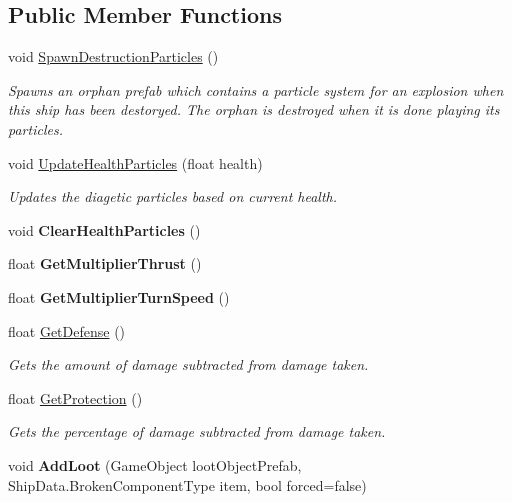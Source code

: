 \subsection*{Public Member Functions}
\begin{DoxyCompactItemize}
\item 
void \hyperlink{class_skyrates_1_1_ship_1_1_ship_hull_a151ef86db5f7fb51fafc874fd2174c6c}{Spawn\-Destruction\-Particles} ()
\begin{DoxyCompactList}\small\item\em Spawns an orphan prefab which contains a particle system for an explosion when this ship has been destoryed. The orphan is destroyed when it is done playing its particles. \end{DoxyCompactList}\item 
void \hyperlink{class_skyrates_1_1_ship_1_1_ship_hull_addcf983df8b3aa8556d77730be45ecc8}{Update\-Health\-Particles} (float health)
\begin{DoxyCompactList}\small\item\em Updates the diagetic particles based on current health. \end{DoxyCompactList}\item 
\hypertarget{class_skyrates_1_1_ship_1_1_ship_hull_aec02117909883a4e32676b3431f92072}{void {\bfseries Clear\-Health\-Particles} ()}\label{class_skyrates_1_1_ship_1_1_ship_hull_aec02117909883a4e32676b3431f92072}

\item 
\hypertarget{class_skyrates_1_1_ship_1_1_ship_hull_a31ea2269f79ffc533d3c0ce80ac59a24}{float {\bfseries Get\-Multiplier\-Thrust} ()}\label{class_skyrates_1_1_ship_1_1_ship_hull_a31ea2269f79ffc533d3c0ce80ac59a24}

\item 
\hypertarget{class_skyrates_1_1_ship_1_1_ship_hull_a97cbc4f31c6664328ce5ac804e4b5510}{float {\bfseries Get\-Multiplier\-Turn\-Speed} ()}\label{class_skyrates_1_1_ship_1_1_ship_hull_a97cbc4f31c6664328ce5ac804e4b5510}

\item 
float \hyperlink{class_skyrates_1_1_ship_1_1_ship_hull_a22cc110b5c5d2ee55b9da0c34da68468}{Get\-Defense} ()
\begin{DoxyCompactList}\small\item\em Gets the amount of damage subtracted from damage taken. \end{DoxyCompactList}\item 
float \hyperlink{class_skyrates_1_1_ship_1_1_ship_hull_adb5a6383a4f88675441a24f4c7c33f8b}{Get\-Protection} ()
\begin{DoxyCompactList}\small\item\em Gets the percentage of damage subtracted from damage taken. \end{DoxyCompactList}\item 
\hypertarget{class_skyrates_1_1_ship_1_1_ship_hull_a1ec01ed2a0eff0018dc11db98de9dbd6}{void {\bfseries Add\-Loot} (Game\-Object loot\-Object\-Prefab, Ship\-Data.\-Broken\-Component\-Type item, bool forced=false)}\label{class_skyrates_1_1_ship_1_1_ship_hull_a1ec01ed2a0eff0018dc11db98de9dbd6}


\end{DoxyCompactItemize}
